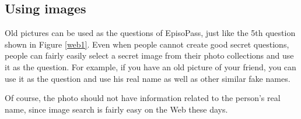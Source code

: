 \documentclass[runningheads,a4paper]{llncs}
\begin{document}
\subsection{Using images}

Old pictures can be used as the questions of EpisoPass,
just like the 5th question shown in Figure \ref{web1}.
Even when people cannot create good secret questions,
people can fairly easily select a secret image from their photo collections
and use it as the question.
For example, if you have an old picture of your friend,
you can use it as the question
and use his real name as well as other similar fake names.


Of course, the photo should not have information related to the
person's real name, since image search is fairly easy on the Web these days.



% 
% 
% 
%
\end{document}
